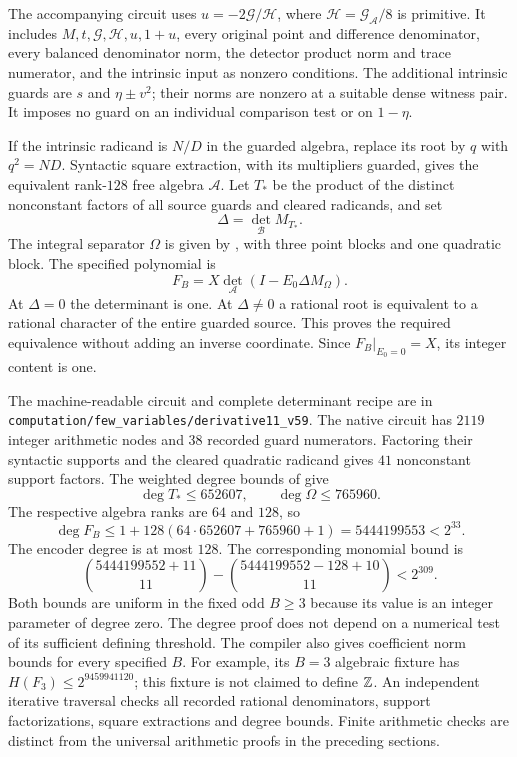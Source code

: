 \documentclass[11pt,a4paper]{article}
\begin{document}
The accompanying circuit uses $u=-2\mathcal G/\mathcal H$, where
$\mathcal H=\mathcal G_{\mathcal A}/8$ is primitive. It includes
$M,t,\mathcal G,\mathcal H,u,1+u$, every original point and difference
denominator, every balanced denominator norm, the detector product norm
and trace numerator, and the intrinsic input as nonzero conditions.
The additional intrinsic guards are $s$ and $\eta\pm v^2$; their
norms are nonzero at a suitable dense witness pair. It imposes no
guard on an individual comparison test or on $1-\eta$.

If the intrinsic radicand is $N/D$ in the guarded algebra, replace its
root by $q$ with $q^2=ND$. Syntactic square extraction, with its
multipliers guarded, gives the equivalent rank-$128$ free algebra
$\mathcal A$. Let $T_*$ be the product of the distinct nonconstant
factors of all source guards and cleared radicands, and set
\[
 \Delta=\det_{\mathcal B}M_{T_*}.
\]
The integral separator $\Omega$ is given by \cite[Section 6]{Unit},
with three point blocks and one quadratic block. The specified polynomial is
\[
             F_B=X\det_{\mathcal A}(I-E_0\Delta M_\Omega).
\]
At $\Delta=0$ the determinant is one. At $\Delta\ne0$ a rational
root is equivalent to a rational character of the entire guarded source.
This proves the required equivalence without adding an inverse coordinate.
Since $F_B|_{E_0=0}=X$, its integer content is one.

The machine-readable circuit and complete determinant recipe are in
\nolinkurl{computation/few_variables/derivative11_v59}.
The native circuit has $2119$ integer arithmetic nodes and $38$ recorded
guard numerators. Factoring their syntactic supports and the cleared
quadratic radicand gives $41$ nonconstant support factors.
The weighted degree bounds of \cite{Unit} give
\[
 \deg T_*\le652607,\qquad \deg\Omega\le765960.
\]
The respective algebra ranks are $64$ and $128$, so
\[
 \deg F_B\le1+128(64\cdot652607+765960+1)
                         =5444199553<2^{33}.
\]
The encoder degree is at most $128$. The corresponding monomial bound is
\[
 \binom{5444199552+11}{11}
 -\binom{5444199552-128+10}{11}<2^{309}.
\]
Both bounds are uniform in the fixed odd $B\ge3$ because its value is
an integer parameter of degree zero. The degree proof does not depend
on a numerical test of its sufficient defining threshold.
The compiler also gives coefficient norm bounds for every specified $B$.
For example, its $B=3$ algebraic fixture has
$H(F_3)\le2^{9459941120}$; this fixture is not claimed to define $\mathbb Z$.
An independent iterative traversal checks all recorded rational
 denominators, support factorizations, square extractions and degree bounds.
Finite arithmetic checks are distinct from the universal arithmetic
proofs in the preceding sections.
\end{document}

